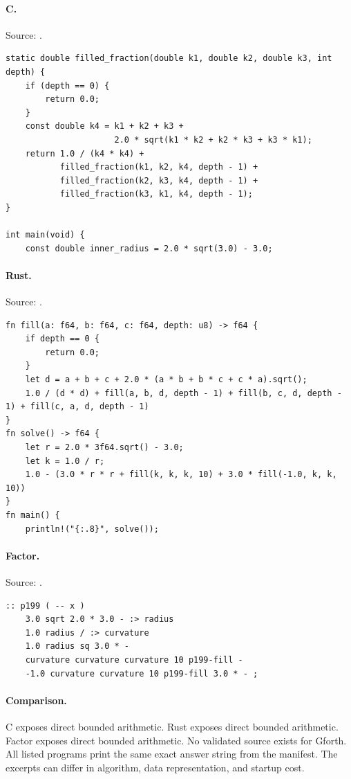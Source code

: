 \paragraph{C.} Source: .
\begin{lstlisting}
static double filled_fraction(double k1, double k2, double k3, int depth) {
    if (depth == 0) {
        return 0.0;
    }
    const double k4 = k1 + k2 + k3 +
                      2.0 * sqrt(k1 * k2 + k2 * k3 + k3 * k1);
    return 1.0 / (k4 * k4) +
           filled_fraction(k1, k2, k4, depth - 1) +
           filled_fraction(k2, k3, k4, depth - 1) +
           filled_fraction(k3, k1, k4, depth - 1);
}

int main(void) {
    const double inner_radius = 2.0 * sqrt(3.0) - 3.0;
\end{lstlisting}

\paragraph{Rust.} Source: .
\begin{lstlisting}
fn fill(a: f64, b: f64, c: f64, depth: u8) -> f64 {
    if depth == 0 {
        return 0.0;
    }
    let d = a + b + c + 2.0 * (a * b + b * c + c * a).sqrt();
    1.0 / (d * d) + fill(a, b, d, depth - 1) + fill(b, c, d, depth - 1) + fill(c, a, d, depth - 1)
}
fn solve() -> f64 {
    let r = 2.0 * 3f64.sqrt() - 3.0;
    let k = 1.0 / r;
    1.0 - (3.0 * r * r + fill(k, k, k, 10) + 3.0 * fill(-1.0, k, k, 10))
}
fn main() {
    println!("{:.8}", solve());
\end{lstlisting}

\paragraph{Factor.} Source: .
\begin{lstlisting}
:: p199 ( -- x )
    3.0 sqrt 2.0 * 3.0 - :> radius
    1.0 radius / :> curvature
    1.0 radius sq 3.0 * -
    curvature curvature curvature 10 p199-fill -
    -1.0 curvature curvature 10 p199-fill 3.0 * - ;
\end{lstlisting}

\paragraph{Comparison.}
C exposes direct bounded arithmetic. Rust exposes direct bounded arithmetic. Factor exposes direct bounded arithmetic.
No validated source exists for Gforth.
All listed programs print the same exact answer string from the manifest. The excerpts can differ in algorithm, data representation, and startup cost.

